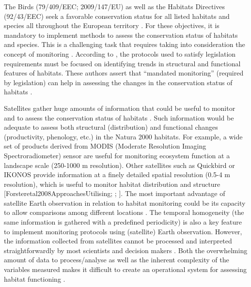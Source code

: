 The Birds (79/409/EEC; 2009/147/EU) as well as the Habitats Directives (92/43/EEC) seek a favorable conservation status for all listed habitats and species all throughout the European territory \autocite{Louetteetal2011BridgingGap}. For these objectives, it is mandatory to implement methods to assess the conservation status of habitats and species. This is a challenging task that requires taking into consideration the concept of monitoring \autocite{LindenmayerLikens2010ScienceApplication,PereiraCooper2006GlobalMonitoring}. According to \textcite{LindenmayerLikens2010ScienceApplication}, the protocols used to satisfy legislation requirements must be focused on identifying trends in structural and functional features of habitats. These authors assert that ``mandated monitoring'' (required by legislation) can help in assessing the changes in the conservation status of habitats \autocite{LindenmayerLikens2010ScienceApplication}.

Satellites gather huge amounts of information that could be useful to monitor and to assess the conservation status of habitats \autocite{VandenBorreetal2011IntegratingRemote}. Such information would be adequate to assess both structural (distribution) and functional changes (productivity, phenology, etc.) in the Natura 2000 habitats. For example, a wide set of products derived from MODIS (Moderate Resolution Imaging Spectroradiometer) sensor are useful for monitoring ecosystem function at a landscape scale (250-1000 m resolution)\autocite{Halletal2002MODISSnowcover,Hueteetal2002OverviewRadiometric,Justiceetal2002OverviewMODIS}. Other satellites such as Quickbird or IKONOS provide information at a finely detailed spatial resolution (0.5-4 m resolution), which is useful to monitor habitat distribution and structure {[}Forsteretal2008ApproachesUtilising; \textcite{Hydeetal2006MappingForest}; \textcite{Wangetal2004ComparisonIKONOS}{]}. The most important advantage of satellite Earth observation in relation to habitat monitoring could be its capacity to allow comparisons among different locations \autocite{VandenBorreetal2011IntegratingRemote}. The temporal homogeneity (the same information is gathered with a predefined periodicity) is also a key feature to implement monitoring protocols using (satellite) Earth observation. However, the information collected from satellites cannot be processed and interpreted straightforwardly by most scientists and decision makers \autocite{Kallurietal2003PotentialRemote}. Both the overwhelming amount of data to process/analyse as well as the inherent complexity of the variables measured makes it difficult to create an operational system for assessing habitat functioning \autocite{Xueetal2011HighThroughput}.

